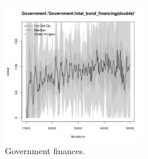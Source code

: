\begin{figure}[H!]
\begin{minipage}{14cm}
\includegraphics[width=6cm]{./png/tax_0.10/Government-total_bond_financing.png}
\end{minipage}
\caption{Government finances.}
\label{Figure: Government}
\end{figure}
\clearpage

